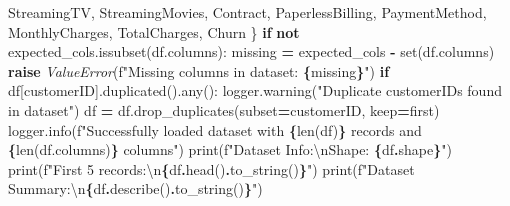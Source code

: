 \documentclass[preprint, 3p,
authoryear]{elsarticle} %
\newenvironment{Shaded}{\begin{snugshade}}{\end{snugshade}}
\newcommand{\BuiltInTok}[1]{#1}
\newcommand{\CharTok}[1]{\textcolor[rgb]{0.31,0.60,0.02}{#1}}
\newcommand{\ControlFlowTok}[1]{\textcolor[rgb]{0.13,0.29,0.53}{\textbf{#1}}}
\newcommand{\KeywordTok}[1]{\textcolor[rgb]{0.13,0.29,0.53}{\textbf{#1}}}
\newcommand{\NormalTok}[1]{#1}
\newcommand{\OperatorTok}[1]{\textcolor[rgb]{0.81,0.36,0.00}{\textbf{#1}}}
\newcommand{\PreprocessorTok}[1]{\textcolor[rgb]{0.56,0.35,0.01}{\textit{#1}}}
\newcommand{\SpecialCharTok}[1]{\textcolor[rgb]{0.81,0.36,0.00}{\textbf{#1}}}
\newcommand{\SpecialStringTok}[1]{\textcolor[rgb]{0.31,0.60,0.02}{#1}}
\newcommand{\StringTok}[1]{\textcolor[rgb]{0.31,0.60,0.02}{#1}}
\begin{document}
\begin{Shaded}
\begin{Highlighting}[]
            \StringTok{\textquotesingle{}StreamingTV\textquotesingle{}}\NormalTok{, }\StringTok{\textquotesingle{}StreamingMovies\textquotesingle{}}\NormalTok{, }\StringTok{\textquotesingle{}Contract\textquotesingle{}}\NormalTok{, }\StringTok{\textquotesingle{}PaperlessBilling\textquotesingle{}}\NormalTok{,}
            \StringTok{\textquotesingle{}PaymentMethod\textquotesingle{}}\NormalTok{, }\StringTok{\textquotesingle{}MonthlyCharges\textquotesingle{}}\NormalTok{, }\StringTok{\textquotesingle{}TotalCharges\textquotesingle{}}\NormalTok{, }\StringTok{\textquotesingle{}Churn\textquotesingle{}}
\NormalTok{        \}}
        \ControlFlowTok{if} \KeywordTok{not}\NormalTok{ expected\_cols.issubset(df.columns):}
\NormalTok{            missing }\OperatorTok{=}\NormalTok{ expected\_cols }\OperatorTok{{-}} \BuiltInTok{set}\NormalTok{(df.columns)}
            \ControlFlowTok{raise} \PreprocessorTok{ValueError}\NormalTok{(}\SpecialStringTok{f"Missing columns in dataset: }\SpecialCharTok{\{}\NormalTok{missing}\SpecialCharTok{\}}\SpecialStringTok{"}\NormalTok{)}
        \ControlFlowTok{if}\NormalTok{ df[}\StringTok{\textquotesingle{}customerID\textquotesingle{}}\NormalTok{].duplicated().}\BuiltInTok{any}\NormalTok{():}
\NormalTok{            logger.warning(}\StringTok{"Duplicate customerIDs found in dataset"}\NormalTok{)}
\NormalTok{            df }\OperatorTok{=}\NormalTok{ df.drop\_duplicates(subset}\OperatorTok{=}\StringTok{\textquotesingle{}customerID\textquotesingle{}}\NormalTok{, keep}\OperatorTok{=}\StringTok{\textquotesingle{}first\textquotesingle{}}\NormalTok{)}
\NormalTok{        logger.info(}\SpecialStringTok{f"Successfully loaded dataset with }\SpecialCharTok{\{}\BuiltInTok{len}\NormalTok{(df)}\SpecialCharTok{\}}\SpecialStringTok{ records and }\SpecialCharTok{\{}\BuiltInTok{len}\NormalTok{(df.columns)}\SpecialCharTok{\}}\SpecialStringTok{ columns"}\NormalTok{)}
        \BuiltInTok{print}\NormalTok{(}\SpecialStringTok{f"Dataset Info:}\CharTok{\textbackslash{}n}\SpecialStringTok{Shape: }\SpecialCharTok{\{}\NormalTok{df}\SpecialCharTok{.}\NormalTok{shape}\SpecialCharTok{\}}\SpecialStringTok{"}\NormalTok{)}
        \BuiltInTok{print}\NormalTok{(}\SpecialStringTok{f"First 5 records:}\CharTok{\textbackslash{}n}\SpecialCharTok{\{}\NormalTok{df}\SpecialCharTok{.}\NormalTok{head()}\SpecialCharTok{.}\NormalTok{to\_string()}\SpecialCharTok{\}}\SpecialStringTok{"}\NormalTok{)}
        \BuiltInTok{print}\NormalTok{(}\SpecialStringTok{f"Dataset Summary:}\CharTok{\textbackslash{}n}\SpecialCharTok{\{}\NormalTok{df}\SpecialCharTok{.}\NormalTok{describe()}\SpecialCharTok{.}\NormalTok{to\_string()}\SpecialCharTok{\}}\SpecialStringTok{"}\NormalTok{)}

\end{Highlighting}
\end{Shaded}
\end{document}
